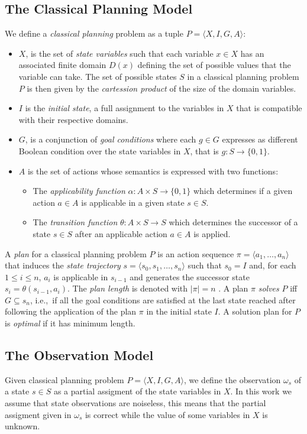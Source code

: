 \documentclass[letterpaper]{article} %
\newcommand{\tup}[1]{{\langle #1 \rangle}}
\begin{document}
\subsection{The Classical Planning Model}
We define a {\em classical planning} problem as a tuple $P=\tup{X,I,G,A}$:
\begin{itemize}
\item $X$, is the set of {\em state variables} such that each variable $x\in X$ has an associated finite domain $D(x)$ defining the set of possible values that the variable can take. The set of possible states $S$ in a classical planning problem $P$ is then given by the {\em cartession product} of the size of the domain variables.
\item $I$ is the {\em initial state}, a full assignment to the variables in $X$ that is compatible with their respective domains.
\item $G$, is a conjunction of {\em goal conditions} where each $g\in G$ expresses as different Boolean condition over the state variables in $X$, that is $g:S\rightarrow \{0,1\}$.
\item $A$ is the set of actions whose semantics is expressed with two functions:
\begin{itemize}
\item The {\em applicability function} $\alpha:A\times S\rightarrow \{0,1\}$ which determines if a given action $a\in A$ is applicable in a given state $s\in S$.
\item The {\em transition function} $\theta:A\times S\rightarrow S$ which determines the successor of a state $s\in S$ after an applicable action $a\in A$ is applied.
\end{itemize}
\end{itemize}

A {\em plan} for a classical planning problem $P$ is an action sequence $\pi=\tup{a_1, \ldots, a_n}$ that induces the {\em state trajectory} $s=\tup{s_0, s_1, \ldots, s_n}$ such that $s_0=I$ and, for each {\small $1\leq i\leq n$}, $a_i$ is applicable in $s_{i-1}$ and generates the successor state $s_i=\theta(s_{i-1},a_i)$. The {\em plan length} is denoted with $|\pi|=n$ . A plan $\pi$ {\em solves} $P$ iff $G\subseteq s_n$, i.e.,~if all the goal conditions are satisfied at the last state reached after following the application of the plan $\pi$ in the initial state $I$. A solution plan for $P$ is {\em optimal} if it has minimum length.

\subsection{The Observation Model}
Given classical planning problem $P=\tup{X,I,G,A}$, we define the observation $\omega_s$ of a state $s\in S$ as a partial assigment of the state variables in $X$. In this work we assume that state observations are noiseless, this means that the partial assigment given in $\omega_s$ is correct while the value of some variables in $X$ is unknown.
\end{document}

